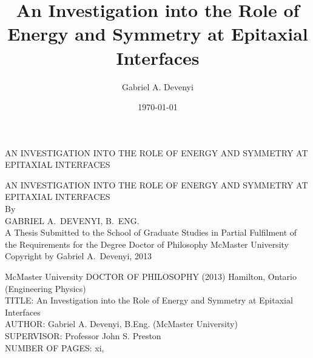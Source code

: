 \documentclass[letterpaper,12pt,twoside]{report}
\title{An Investigation into the Role of Energy and Symmetry at Epitaxial Interfaces}
\author{Gabriel A. Devenyi}
\date{\today}
\begin{document}
\begin{titlepage} %
    \thispagestyle{empty}
    \vspace*{\fill}
    \begin{center}{\Large
    \uppercase{An Investigation into the Role of Energy and Symmetry at Epitaxial Interfaces}}
    \end{center}
    \vspace*{\fill}
    \setcounter{page}{0}
\end{titlepage}
\begin{titlepage} %
\thispagestyle{empty}
\centering
\vspace*{\fill} %
{\Large \uppercase{An Investigation into the Role of Energy and Symmetry at Epitaxial Interfaces}\\
By\\GABRIEL A.\ DEVENYI, B.\ ENG.\\}
\vfill
A Thesis Submitted to the School of Graduate Studies in Partial Fulfilment of
the Requirements for the Degree Doctor of Philosophy
McMaster University
\vfill%
\textcopyright{} Copyright by Gabriel A.\ Devenyi, 2013
\end{titlepage}
{\noindent McMaster University DOCTOR OF PHILOSOPHY (2013) Hamilton, Ontario (Engineering Physics)\\
TITLE: An Investigation into the Role of Energy and Symmetry at Epitaxial Interfaces\\
AUTHOR: Gabriel A. Devenyi, B.Eng. (McMaster University)\\
SUPERVISOR: Professor John S. Preston\\
NUMBER OF PAGES: xi,~\pageref{LastPage}}
\end{document}
